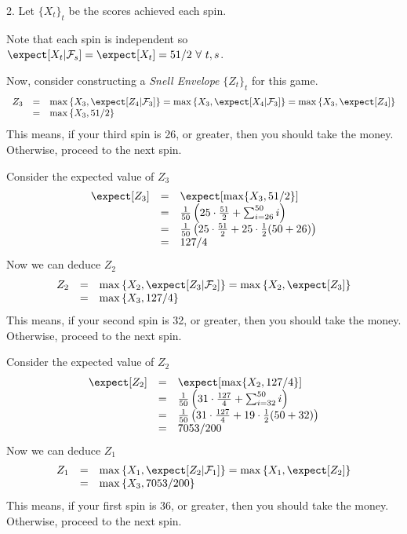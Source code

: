\documentclass[11pt,a4paper]{article}
\begin{document}
\begin{answer}{2.}
  Let $\{X_t\}_{t}$ be the scores achieved each spin.
  \par Note that each spin is independent so $\expect[X_t|\mathcal{F}_s]=\expect[X_t]=51/2\ \forall\ t,s$.
  \par Now, consider constructing a \textit{Snell Envelope} $\{Z_t\}_t$ for this game.
  \[\begin{array}{rcl}
    Z_3&=&\max\left\{X_3,\expect[Z_4|\mathcal{F}_3]\right\}=\max\left\{X_3,\expect[X_4|\mathcal{F}_3]\right\}=\max\left\{X_3,\expect[Z_4]\right\}\\
    &=&\max\left\{X_3,51/2\right\}
  \end{array}\]
  This means, if your third spin is 26, or greater, then you should take the money. Otherwise, proceed to the next spin.
  \par Consider the expected value of $Z_3$
  \[\begin{array}{rcl}
    \expect[Z_3]&=&\expect[\max\{X_3,51/2\}]\\
    &=&\frac1{50}\left(25\cdot\frac{51}2+\sum_{i=26}^{50}i\right)\\
    &=&\frac1{50}\left(25\cdot\frac{51}2+25\cdot\frac12(50+26)\right)\\
    &=&127/4
  \end{array}\]
  Now we can deduce $Z_2$
  \[\begin{array}{rcl}
    Z_2&=&\max\left\{X_2,\expect[Z_3|\mathcal{F}_2]\right\}=\max\left\{X_2,\expect[Z_3]\right\}\\
    &=&\max\left\{X_3,127/4\right\}
  \end{array}\]
  This means, if your second spin is 32, or greater, then you should take the money. Otherwise, proceed to the next spin.
  \par Consider the expected value of $Z_2$
  \[\begin{array}{rcl}
    \expect[Z_2]&=&\expect[\max\{X_2,127/4\}]\\
    &=&\frac1{50}\left(31\cdot\frac{127}4+\sum_{i=32}^{50}i\right)\\
    &=&\frac1{50}\left(31\cdot\frac{127}4+19\cdot\frac12(50+32)\right)\\
    &=&7053/200
  \end{array}\]
  Now we can deduce $Z_1$
  \[\begin{array}{rcl}
    Z_1&=&\max\left\{X_1,\expect[Z_2|\mathcal{F}_1]\right\}=\max\left\{X_1,\expect[Z_2]\right\}\\
    &=&\max\left\{X_3,7053/200\right\}
  \end{array}\]
  This means, if your first spin is 36, or greater, then you should take the money. Otherwise, proceed to the next spin.
\end{answer}
\end{document}

